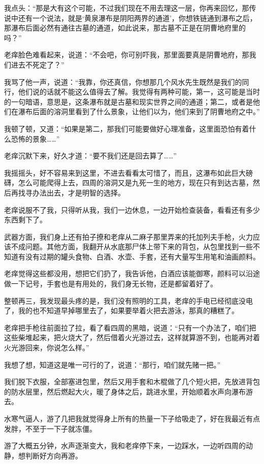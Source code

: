 我点头：“那是大有这个可能，不过我们现在不用去理这一层，你再来回忆，那传说中还有一个说法，就是‘黄泉瀑布是阴阳两界的通道’，你想铁链通到瀑布之后，那瀑布后面必然有通往古墓的通道，如此说来，那古墓不正是在阴曹地府里的吗？”

老痒脸色难看起来，说道：“不会吧，你可别吓我，那里面要真是阴曹地府，那我们进去不死定了？”

我骂了他一声，说道：“我靠，你还真信，你想那几个风水先生既然是我们的同行，他们说的话就不能这么值得去了解。我觉得有两种可能，第一，这可能是当时的一句暗语，意思是，这条瀑布就是古墓和现实世界之间的通道；第二，或者是他们在瀑布后面的溶洞里看到了什么景象，让他们以为，他们来到了阴曹地府之中。”

我顿了顿，又道：“如果是第二，那我们可能要做好心理准备，这里面恐怕有着什么恐怖的景象……”

老痒沉默下来，好久才道：“要不我们还是回去算了……”

我摇摇头，好不容易来到这里，不进去看看太可惜了，而且，这瀑布如此巨大磅礴，怎么可能爬得上去，四周的溶洞又是九死一生的地方，现在只有到达古墓，然后再找寻办法出去，才是明智的选择。

老痒说服不了我，只得听从我，我们一边休息，一边开始检查装备，看看还有多少东西剩下了。

武器方面，我们身上还有拍子撩和老痒从二麻子那里弄来的托加列夫手枪，火力应该不成问题。其他方面，我翻开从水底那尸体上带下来的背包，从包里找到一些不知道有没有过期的罐头食物、白酒、水壶、手套，还有大量写生用笔和油画颜料。

老痒觉得这些都没用，想把它们扔了，我告诉他，白酒应该能御寒，颜料可以沿途做一下记号，手套也是有用处的，我们身无长物，还是都留着好了。

整顿再三，我发现最头疼的是，我们没有照明的工具，老痒的手电已经彻底没电了，我的也不知道早掉哪里去了，如果要举着火把去游泳，那真的糟糕了。

老痒把手枪往前面拉了拉，看了看四周的黑暗，说道：“只有一个办法了，咱们把这些柴堆起来，把火烧大了，然后借着火光游过去，这样就算游不到，也能再对着火光游回来，你说怎么样。”

我想了想，知道这是唯一可行的了，说道：“那行，咱们就先赌一把。”

我们脱下衣服，全部塞进包里，然后又用手套和木棍做了几个短火把，先放进背包的防水层里，然后燃起大火，暖了身体之后，跳进水里，开始顺着水声向瀑布游去。

水寒气逼人，游了几把我就觉得身上所有的热量一下子给吸走了，好在我最近有点发胖，不至于一下子就冻僵。

游了大概五分钟，水声逐渐变大，我和老痒停下来，一边踩水，一边听四周的动静，想判断好方向再游。

